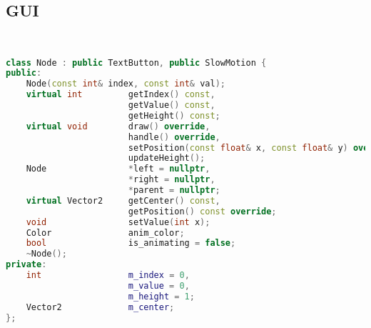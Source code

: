 \subsection{GUI}
\begin{lstlisting}[language=C++]


class Node : public TextButton, public SlowMotion {
public:
    Node(const int& index, const int& val);
    virtual int         getIndex() const,
                        getValue() const,
                        getHeight() const;
    virtual void        draw() override,
                        handle() override,
                        setPosition(const float& x, const float& y) override,
                        updateHeight();
    Node                *left = nullptr,
                        *right = nullptr,
                        *parent = nullptr;
    virtual Vector2     getCenter() const,
                        getPosition() const override;
    void                setValue(int x);
    Color               anim_color;
    bool                is_animating = false;
    ~Node();
private:
    int                 m_index = 0,
                        m_value = 0,
                        m_height = 1;
    Vector2             m_center;
};






\end{lstlisting}
